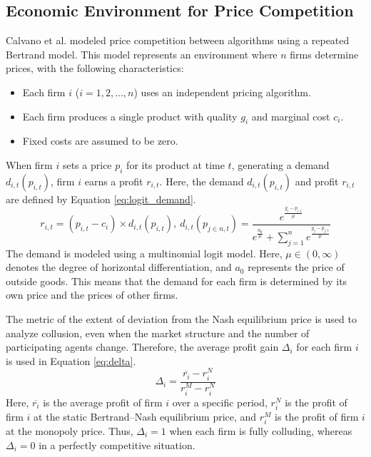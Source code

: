 \documentclass[runningheads]{llncs}
\begin{document}
\subsection{Economic Environment for Price Competition}
    Calvano et al. \cite{calvano2020a} modeled price competition between algorithms using a repeated Bertrand model.
    This model represents an environment where $n$ firms determine prices, with the following characteristics:
    \begin{itemize}
        \item Each firm \(i\) (\(i = 1, 2, ..., n\)) uses an independent pricing algorithm.
        \item Each firm produces a single product with quality \(g_i\) and marginal cost \(c_i\).
        \item Fixed costs are assumed to be zero.
    \end{itemize}
    When firm $i$ sets a price $p_i$ for its product at time $t$, generating a demand $d_{i,t} (p_{i,t})$, firm $i$ earns a profit $r_{i,t}$.
    Here, the demand $d_{i,t} (p_{i,t})$ and profit $r_{i,t}$ are defined by Equation \ref{eq:logit_demand}.
    \begin{equation}
    r_{i,t} = (p_{i,t} - c_i) \times d_{i,t} (p_{i,t}),~
        d_{i,t} \left( p_{j \in n,t} \right) = \frac{e^{\frac{g_i - p_{i,t}}{\mu}}}{e^{\frac{a_0}{\mu}} + \sum_{j=1}^{n} e^{\frac{g_j - p_{j,t}}{\mu}}}
        \label{eq:logit_demand}
    \end{equation}
    The demand is modeled using a multinomial logit model.
    Here, $\mu \in (0, \infty)$ denotes the degree of horizontal differentiation, and $a_0$ represents the price of outside goods.
    This means that the demand for each firm is determined by its own price and the prices of other firms.

    The metric of the extent of deviation from the Nash equilibrium price is used to analyze collusion, even when the market structure and the number of participating agents change.
    Therefore, the average profit gain \( \Delta_i \) for each firm \( i \) is used in Equation \ref{eq:delta}.
    \begin{equation}
    \Delta_i = \frac{\overline{r_i} - r_i^N}{r_i^M - r_i^N}
    \label{eq:delta}
    \end{equation}
    Here, \( \overline{r_i} \) is the average profit of firm \( i \) over a specific period,
    \( r_i^N \) is the profit of firm \( i \) at the static Bertrand--Nash equilibrium price, and
    \( r_i^M \) is the profit of firm \( i \) at the monopoly price.
    Thus, \( \Delta_i = 1 \) when each firm is fully colluding, whereas \( \Delta_i = 0 \) in a perfectly competitive situation.
\end{document}
